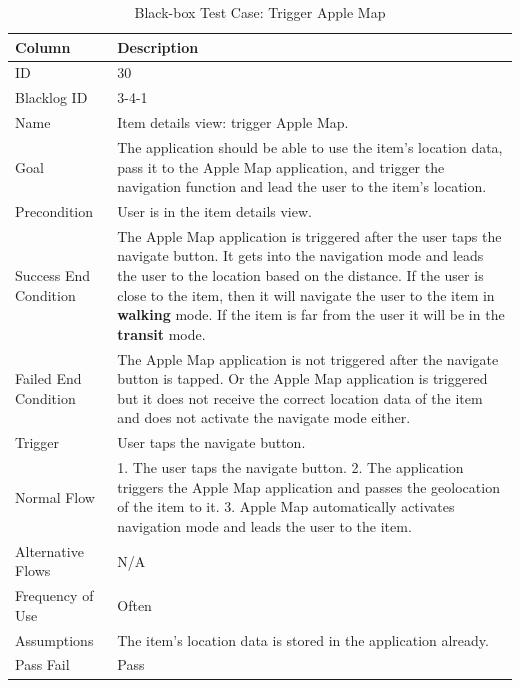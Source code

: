\documentclass[12pt,a4paper]{article}
\begin{document}
          \begin{table}[H]
            \centering
              \begin{tabularx}{\textwidth}{l X}
                \hline
                Column & Description  \\ \hline
                ID & 30 \\
                Blacklog ID & 3-4-1 \\
                Name &  Item details view: trigger Apple Map. \\
                Goal &  The application should be able to use the item's location data, pass it to the Apple Map application, and trigger the navigation function and lead the user to the item's location.       \\
                Precondition & User is in the item details view.        \\
                Success End Condition & The Apple Map application is triggered after the user taps the navigate button. It gets into the navigation mode and leads the user to the location based on the distance. If the user is close to the item, then it will navigate the user to the item in {\bf walking} mode. If the item is far from the user it will be in the {\bf transit} mode.         \\
                Failed End Condition & The Apple Map application is not triggered after the navigate button is tapped. Or the Apple Map application is triggered but it does not receive the correct location data of the item and does not activate the navigate mode either.           \\
                Trigger & User taps the navigate button. \\
                Normal Flow & 1. The user taps the navigate button. 2. The application triggers the Apple Map application and passes the geolocation of the item to it. 3. Apple Map automatically activates navigation mode and leads the user to the item. \\
                Alternative Flows & N/A \\
                Frequency of Use & Often \\
                Assumptions & The item's location data is stored in the application already. \\
                Pass Fail & Pass \\
                \hline
              \end{tabularx}
              \caption[Table caption text]{Black-box Test Case: Trigger Apple Map}
              \label{table:Black-box Test Case: Trigger Apple Map}
          \end{table}
\end{document}
